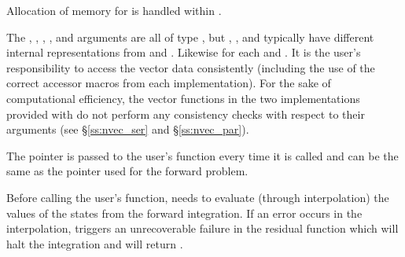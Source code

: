 {
  Allocation of memory for  is handled within {\idas}.

  The , , , , and  arguments are all
  of type , but , , and  typically have
  different internal representations from  and . Likewise for each
   and . It is the user's
  responsibility to access the vector data consistently (including the use of the
  correct accessor macros from each {\nvector} implementation). For the sake of
  computational efficiency, the vector functions in the two {\nvector} implementations
  provided with {\idas} do not perform any consistency checks with respect to their
   arguments (see \S\ref{ss:nvec_ser} and \S\ref{ss:nvec_par}).

  The  pointer is passed to
  the user's  function every time it is called and can be the same as the
   pointer used for the forward problem.

  {\warn}Before calling the user's  function, {\idas} needs to evaluate
  (through interpolation) the values of the states from the forward integration.
  If an error occurs in the interpolation, {\idas} triggers an unrecoverable
  failure in the residual function which will halt the integration and
   will return .
}


